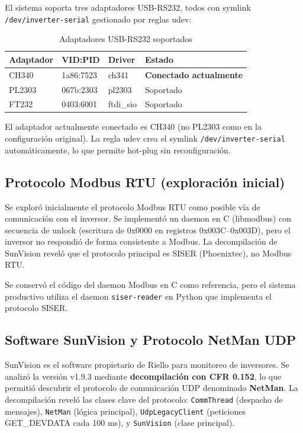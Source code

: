 \documentclass[12pt,a4paper]{article}
\begin{document}
El sistema soporta tres adaptadores USB-RS232, todos con symlink \texttt{/dev/inverter-serial} gestionado por reglas udev:

\begin{table}[H]
\centering
\begin{tabular}{llll}
\toprule
\textbf{Adaptador} & \textbf{VID:PID} & \textbf{Driver} & \textbf{Estado} \\
\midrule
CH340 & 1a86:7523 & ch341 & \textbf{Conectado actualmente} \\
PL2303 & 067b:2303 & pl2303 & Soportado \\
FT232 & 0403:6001 & ftdi\_sio & Soportado \\
\bottomrule
\end{tabular}
\caption{Adaptadores USB-RS232 soportados}
\end{table}

\begin{notebox}
El adaptador actualmente conectado es CH340 (no PL2303 como en la configuraci\'on original). La regla udev crea el symlink \texttt{/dev/inverter-serial} autom\'aticamente, lo que permite hot-plug sin reconfiguraci\'on.
\end{notebox}

\subsection{Protocolo Modbus RTU (exploraci\'on inicial)}

Se explor\'o inicialmente el protocolo Modbus RTU como posible v\'ia de comunicaci\'on con el inversor. Se implement\'o un daemon en C (libmodbus) con secuencia de unlock (escritura de 0x0000 en registros 0x003C--0x003D), pero el inversor no respondi\'o de forma consistente a Modbus. La decompilaci\'on de SunVision revel\'o que el protocolo principal es SISER (Phoenixtec), no Modbus RTU.

Se conserv\'o el c\'odigo del daemon Modbus en C como referencia, pero el sistema productivo utiliza el daemon \texttt{siser-reader} en Python que implementa el protocolo SISER.

\subsection{Software SunVision y Protocolo NetMan UDP}

SunVision es el software propietario de Riello para monitoreo de inversores. Se analiz\'o la versi\'on v1.9.3 mediante \textbf{decompilaci\'on con CFR 0.152}, lo que permiti\'o descubrir el protocolo de comunicaci\'on UDP denominado \textbf{NetMan}. La decompilaci\'on revel\'o las clases clave del protocolo: \texttt{CommThread} (despacho de mensajes), \texttt{NetMan} (l\'ogica principal), \texttt{UdpLegacyClient} (peticiones GET\_DEVDATA cada 100 ms), y \texttt{SunVision} (clase principal).
\end{document}
